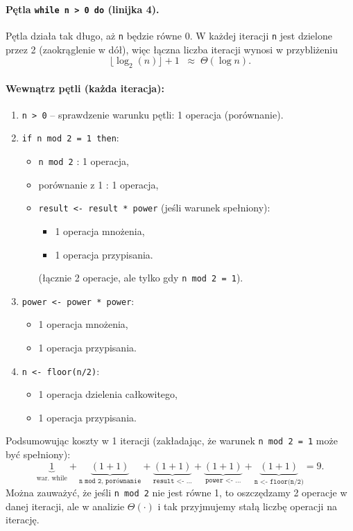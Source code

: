 \documentclass[12pt]{article}
\begin{document}
\paragraph{Pętla \texttt{while n > 0 do} (linijka 4).}
Pętla działa tak długo, aż \texttt{n} będzie równe 0. W każdej iteracji \texttt{n} jest dzielone przez 2 (zaokrąglenie w dół), więc łączna liczba iteracji wynosi w przybliżeniu
\[
\lfloor \log_2(n) \rfloor + 1 \;\;\approx\; \Theta(\log n).
\]

\paragraph{Wewnątrz pętli (każda iteracja):}
\begin{enumerate}
    \item \texttt{n > 0} -- sprawdzenie warunku pętli: 1 operacja (porównanie).
    \item \texttt{if n mod 2 = 1 then}:
    \begin{itemize}
        \item \texttt{n mod 2} : 1 operacja,
        \item porównanie z 1 : 1 operacja,
        \item \texttt{result <- result * power} (jeśli warunek spełniony):
        \begin{itemize}
            \item 1 operacja mnożenia,
            \item 1 operacja przypisania.
        \end{itemize}
        (łącznie 2 operacje, ale tylko gdy \texttt{n mod 2 = 1}). 
    \end{itemize}
    \item \texttt{power <- power * power}:
    \begin{itemize}
        \item 1 operacja mnożenia,
        \item 1 operacja przypisania.
    \end{itemize}
    \item \texttt{n <- floor(n/2)}:
    \begin{itemize}
        \item 1 operacja dzielenia całkowitego,
        \item 1 operacja przypisania.
    \end{itemize}
\end{enumerate}

\noindent
Podsumowując koszty w 1 iteracji (zakładając, że warunek \texttt{n mod 2 = 1} może być spełniony):
\[
\underbrace{1}_{\text{war. while}} 
+ \underbrace{(1 + 1)}_{\texttt{n mod 2, porównanie}} 
+ \underbrace{(1 + 1)}_{\texttt{result <- ...}} 
+ \underbrace{(1 + 1)}_{\texttt{power <- ...}}
+ \underbrace{(1 + 1)}_{\texttt{n <- floor(n/2)}} 
= 9.
\]
Można zauważyć, że jeśli \texttt{n mod 2} nie jest równe 1, to oszczędzamy 2 operacje w danej iteracji, ale w analizie \(\Theta(\cdot)\) i tak przyjmujemy stałą liczbę operacji na iterację.
\end{document}
